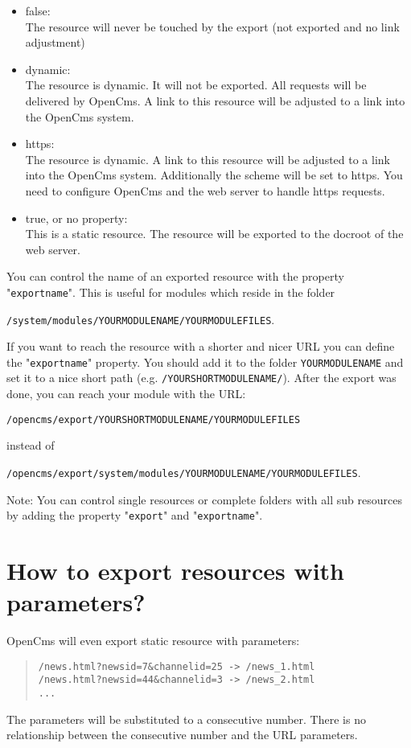 \begin{itemize}
\item false:\\
The resource will never be touched by the export (not exported and no link adjustment)

\item dynamic:\\
The resource is dynamic. It will not be exported. All requests will be delivered by OpenCms. A link to this resource will be adjusted to a link into the OpenCms system.

\item https:\\
The resource is dynamic. A link to this resource will be adjusted to a link into the OpenCms system. Additionally the scheme will be set to https. You need to configure OpenCms and the web server to handle https requests.

\item true, or no property:\\
This is a static resource. The resource will be exported to the docroot of the web server.
\end{itemize}

You can control the name of an exported resource with the property "\texttt{exportname}". This is useful for modules which reside in the folder 

\texttt{/system/modules/YOURMODULENAME/YOURMODULEFILES}. 

If you want to reach the resource with a shorter and nicer URL you can define the "\texttt{exportname}" property. You should add it to the folder \texttt{YOURMODULENAME} and set it to a nice short path (e.g. \texttt{/YOURSHORTMODULENAME/}). After the export was done, you can reach your module with the URL:

\texttt{/opencms/export/YOURSHORTMODULENAME/YOURMODULEFILES}

instead of

\texttt{/opencms/export/system/modules/YOURMODULENAME/YOURMODULEFILES}.

Note: You can control single resources or complete folders with all sub resources by adding the property "\texttt{export}" and "\texttt{exportname}".

\section{How to export resources with parameters?}

OpenCms will even export static resource with parameters:

\begin{quote}
\begin{verbatim}
/news.html?newsid=7&channelid=25 -> /news_1.html
/news.html?newsid=44&channelid=3 -> /news_2.html
...
\end{verbatim}
\end{quote}

The parameters will be substituted to a consecutive number. There is no relationship between the consecutive number and the URL parameters.
